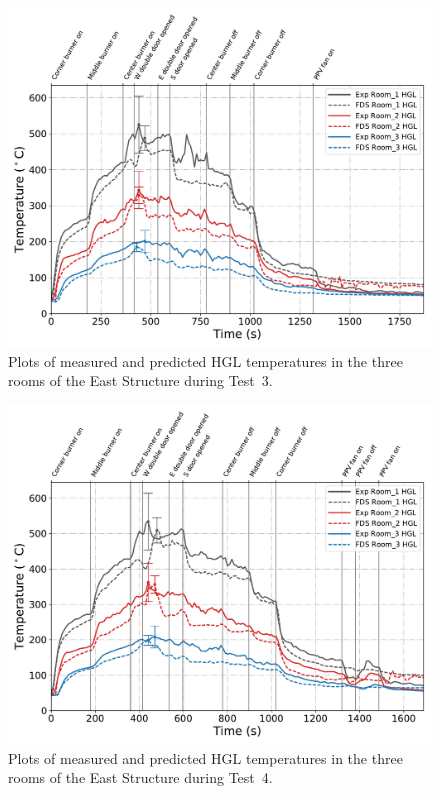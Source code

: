 \begin{figure}[!h]
	\centering
	\includegraphics[width=\columnwidth]{Figures/Plots/Validation/Temperature/Test_3_HGL}
	\caption[Plots of measured and predicted HGL temperatures during Test~3.]{Plots of measured and predicted HGL temperatures in the three rooms of the East Structure during Test~3.}
	\label{fig:HGL_data_Test3}
\end{figure}

\begin{figure}[!h]
	\centering
	\includegraphics[width=\columnwidth]{Figures/Plots/Validation/Temperature/Test_4_HGL}
	\caption[Plots of measured and predicted HGL temperatures during Test~4.]{Plots of measured and predicted HGL temperatures in the three rooms of the East Structure during Test~4.}
	\label{fig:HGL_data_Test4}
\end{figure}

